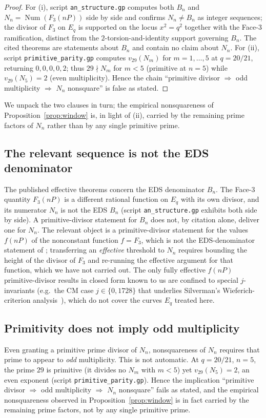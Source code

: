 \documentclass[11pt,reqno]{amsart}
\theoremstyle{plain}
\theoremstyle{definition}
\DeclareMathOperator{\Num}{Num}
\begin{document}
\begin{proof}
For (i), script \texttt{an\_structure.gp} computes both $B_n$ and
$N_n=\Num(F_3(nP))$ side by side and confirms $N_n\neq B_n$ as integer
sequences; the divisor of $F_3$ on $E_q$ is supported on the locus
$x^2=q^2$ together with the Face-3 ramification, distinct from the
$2$-torsion-and-identity support governing $B_n$. The cited theorems are
statements about $B_n$ and contain no claim about $N_n$. For (ii), script
\texttt{primitive\_parity.gp} computes $v_{29}(N_m)$ for $m=1,\dots,5$ at
$q=20/21$, returning $0,0,0,0,2$; thus $29\nmid N_m$ for $m<5$ (primitive at
$n=5$) while $v_{29}(N_5)=2$ (even multiplicity). Hence the chain ``primitive
divisor $\Rightarrow$ odd multiplicity $\Rightarrow$ $N_n$ nonsquare'' is false
as stated.
\end{proof}

We unpack the two clauses in turn; the empirical nonsquareness of
Proposition~\ref{prop:window} is, in light of (ii), carried by the remaining
prime factors of $N_n$ rather than by any single primitive prime.

\subsection{The relevant sequence is not the EDS denominator}
The published effective theorems concern the EDS denominator $B_n$. The Face-3
quantity $F_3(nP)$ is a different rational function on $E_q$ with its own
divisor, and its numerator $N_n$ is not the EDS $B_n$ (script
\texttt{an\_structure.gp} exhibits both side by side). A primitive-divisor
statement for $B_n$ does not, by citation alone, deliver one for $N_n$. The
relevant object is a primitive-divisor statement for the values $f(nP)$ of the
nonconstant function $f=F_3$, which is not the EDS-denominator statement of
\cite{silverman-eds,ingram-silverman,verzobio}; transferring an \emph{effective}
threshold to $N_n$ requires bounding the height of the divisor of $F_3$ and
re-running the effective argument for that function, which we have not carried
out. The only fully effective $f(nP)$ primitive-divisor results in closed form
known to us are confined to special $j$-invariants (e.g.\ the CM case
$j\in\{0,1728\}$ that underlies Silverman's Wieferich-criterion
analysis~\cite{silverman88}), which do not cover the curves $E_q$ treated here.

\subsection{Primitivity does not imply odd multiplicity}
Even granting a primitive prime divisor of $N_n$, nonsquareness of $N_n$
requires that prime to appear to \emph{odd} multiplicity. This is not automatic.
At $q=20/21$, $n=5$, the prime $29$ is primitive (it divides no $N_m$ with
$m<5$) yet $v_{29}(N_5)=2$, an even exponent (script
\texttt{primitive\_parity.gp}). Hence the implication ``primitive divisor
$\Rightarrow$ odd multiplicity $\Rightarrow$ $N_n$ nonsquare'' fails as stated,
and the empirical nonsquareness observed in Proposition~\ref{prop:window} is in
fact carried by the remaining prime factors, not by any single primitive prime.
\end{document}
